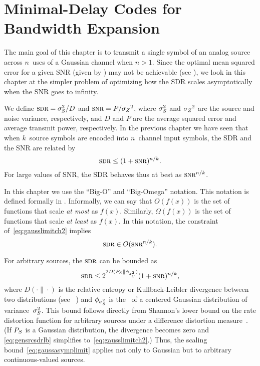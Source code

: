 \chapter{Minimal-Delay Codes for Bandwidth Expansion}\label{ch:mindelbwex}

The main goal of this chapter is to transmit a single symbol of an analog source
across $n$~uses of a Gaussian channel when $n > 1$. Since the optimal mean
squared error for a given SNR (given by ) may not be
achievable (see ), we look in this chapter at the simpler
problem of optimizing how the SDR scales asymptotically when the SNR goes to
infinity. 

We define $\sdr = \ssq / D$ and $\snr = P / \szq$, where ${\sigma_S^2}$ and ${{\sigma_Z}^2}$ are
the source and noise variance, respectively, and $D$ and $P$ are the average
squared error and average transmit power, respectively. In the previous chapter
we have seen that when $k$~source symbols are encoded into $n$~channel input
symbols, the SDR and the SNR are related by
\begin{equation}
  \label{eq:gausslimitch2}
  \sdr \le (1 + \snr)^{n/k}.
\end{equation}
For large values of SNR, the SDR behaves thus at best as $\snr^{n/k}$.

In this chapter we use the ``Big-O'' and ``Big-Omega'' notation. This notation
is defined formally in . Informally, we can say that
$O(f(x))$ is the set of functions that scale \emph{at most}  as $f(x)$.
Similarly, $\Omega(f(x))$ is the set of functions that scale \emph{at least} as
$f(x)$. In this notation, the constraint of~\eqref{eq:gausslimitch2} implies
\begin{equation}
  \label{eq:gaussasymplimit}
  \sdr \in O(\snr^{n/k}).
\end{equation}

For arbitrary sources, the $\sdr$ can be bounded as
\begin{equation}
  \label{eq:gensrcsdrlb}
  \sdr \le 2^{2 D(\ps \| \phi_{\ssq})} (1 + \snr)^{n/k},
\end{equation}
where $D(\cdot\|\cdot)$ is the relative entropy or Kullback-Leibler divergence
between two distributions (see \eg~\cite{CoverT1991}) and $\phi_{{\sigma_S^2}}$ is the
\pdf\ of a centered Gaussian distribution of variance~${\sigma_S^2}$. This bound
follows directly from Shannon's lower bound on the rate distortion function for
arbitrary sources under a difference distortion measure~\cite{Shannon1959}.
(If ${P_S}$ is a Gaussian distribution, the divergence becomes zero and
\eqref{eq:gensrcsdrlb} simplifies to~\eqref{eq:gausslimitch2}.) Thus, the
scaling bound~\eqref{eq:gaussasymplimit} applies not only to Gaussian but to
arbitrary continuous-valued sources.

